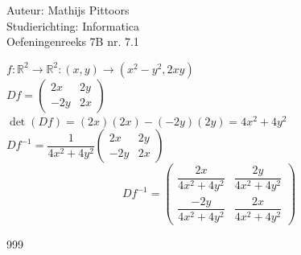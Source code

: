 \documentclass[a4paper]{article}
\newcommand{\setr}{\mathbb{R}}
\begin{document}
  
\noindent \large Auteur: Mathijs Pittoors \\
\noindent \large Studierichting: Informatica\\
\noindent \large Oefeningenreeks 7B nr. 7.1\\

\medskip

\normalsize

$f: \setr^2 \rightarrow \setr^2 : (x,y) \rightarrow (x^2-y^2,2xy)$\\

$Df = \left(\begin{array}{cc}
	2x & 2y\\
	-2y & 2x
\end{array}\right)$\\
	
$\det(Df) = (2x)(2x)-(-2y)(2y) = 4x^2 + 4y^2$\\

$Df^{-1} = \dfrac{1}{4x^2+4y^2} \left(\begin{array}{cc}
	2x & 2y\\
	-2y & 2x
\end{array}\right)$\\

$$Df^{-1} = \left(\begin{array}{cc}
	\dfrac{2x}{4x^2+4y^2} & \dfrac{2y}{4x^2+4y^2}\\
	\dfrac{-2y}{4x^2+4y^2} & \dfrac{2x}{4x^2+4y^2}
\end{array}\right)$$

\begin{thebibliography}{999}
\end{thebibliography}
\end{document}
